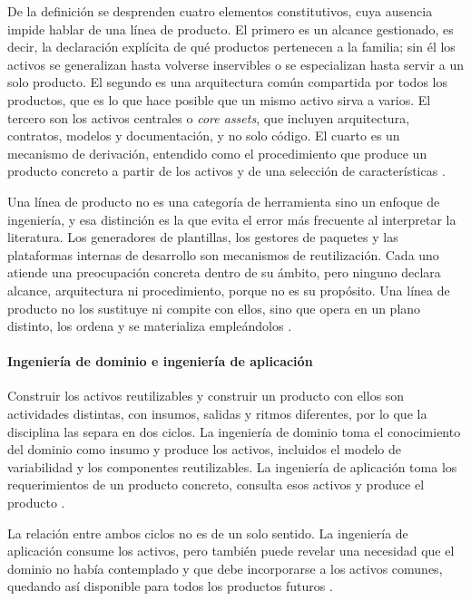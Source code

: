 De la definición se desprenden cuatro elementos constitutivos, cuya ausencia impide hablar de una línea de producto. El primero es un alcance gestionado, es decir, la declaración explícita de qué productos pertenecen a la familia; sin él los activos se generalizan hasta volverse inservibles o se especializan hasta servir a un solo producto. El segundo es una arquitectura común compartida por todos los productos, que es lo que hace posible que un mismo activo sirva a varios. El tercero son los activos centrales o \emph{core assets}, que incluyen arquitectura, contratos, modelos y documentación, y no solo código. El cuarto es un mecanismo de derivación, entendido como el procedimiento que produce un producto concreto a partir de los activos y de una selección de características \citep{Clements2001}.

Una línea de producto no es una categoría de herramienta sino un
enfoque de ingeniería, y esa distinción es la que evita el error más
frecuente al interpretar la literatura. Los generadores de
plantillas, los gestores de paquetes y las plataformas internas de
desarrollo son mecanismos de reutilización. Cada uno atiende una
preocupación concreta dentro de su ámbito, pero ninguno declara
alcance, arquitectura ni procedimiento, porque no es su propósito.
Una línea de producto no los sustituye ni compite con ellos, sino
que opera en un plano distinto, los ordena y se materializa
empleándolos \citep{Clements2001}.
\paragraph*{Ingeniería de dominio e ingeniería de aplicación}
Construir los activos reutilizables y construir un producto con ellos son actividades distintas, con insumos, salidas y ritmos diferentes, por lo que la disciplina las separa en dos ciclos. La ingeniería de dominio toma el conocimiento del dominio como insumo y produce los activos, incluidos el modelo de variabilidad y los componentes reutilizables. La ingeniería de aplicación toma los requerimientos de un producto concreto, consulta esos activos y produce el producto \citep{Pohl2005}.

La relación entre ambos ciclos no es de un solo sentido. La ingeniería de aplicación consume los activos, pero también puede revelar una necesidad que el dominio no había contemplado y que debe incorporarse a los activos comunes, quedando así disponible para todos los productos futuros \citep{Pohl2005}.
